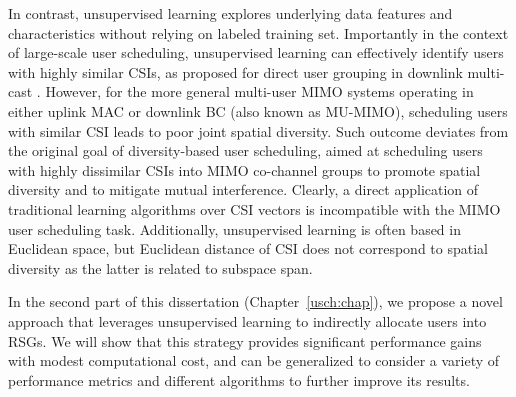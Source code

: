 In contrast, unsupervised learning explores underlying data features and characteristics without relying on labeled training set.
Importantly in the context of large-scale user scheduling, unsupervised learning can effectively identify users with highly similar CSIs, as proposed for direct user grouping in downlink multi-cast \cite{Xu14, Cui18}. 
However, for the more general multi-user MIMO systems operating in either uplink MAC or downlink BC (also known as MU-MIMO), scheduling users with similar CSI leads to poor joint spatial diversity.
Such outcome deviates from the original goal of diversity-based user scheduling, aimed at scheduling users with highly dissimilar CSIs into MIMO co-channel groups to promote spatial diversity and to mitigate mutual interference. 
Clearly, a direct application of traditional learning algorithms over CSI vectors is incompatible with the MIMO user scheduling task. 
Additionally, unsupervised learning is often based in Euclidean space, but Euclidean distance of CSI does not correspond to spatial diversity as the latter is related to subspace span. 

In the second part of this dissertation (Chapter~\ref{usch:chap}), we propose a novel approach that leverages unsupervised learning to indirectly allocate users into RSGs. We will show that this strategy provides significant performance gains with modest computational cost, and can be generalized to consider a variety of performance metrics and different algorithms to further improve its results. 


